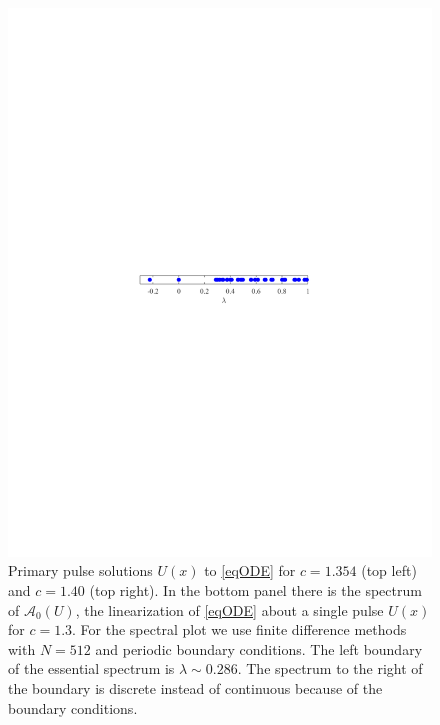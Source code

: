 \documentclass[review,onefignum,onetabnum]{siamart171218}
\newcommand{\calA}{\mathcal{A}}
\begin{document}
\begin{figure}[ht]
\begin{tabular}{cc}
\end{tabular}
\includegraphics{specA0}
\caption{Primary pulse solutions $U(x)$ to \cref{eqODE} for $c = 1.354$ (top left) and $c = 1.40$ (top right). In the bottom panel there is the spectrum of $\calA_0(U)$, the linearization of \cref{eqODE} about a single pulse $U(x)$ for $c = 1.3$. For the spectral plot we use finite difference methods with $N = 512$ and periodic boundary conditions. The left boundary of the essential spectrum is $\lambda\sim0.286$. The spectrum to the right of the boundary is discrete instead of continuous because of the boundary conditions. }
\label{fig:single1}
\end{figure}

\end{document}
